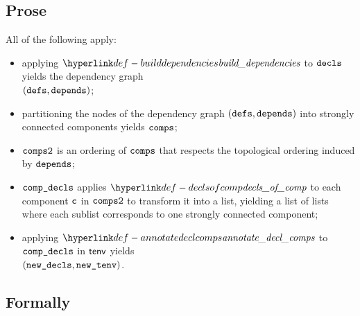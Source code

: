 \subsection{Prose}
All of the following apply:
\begin{itemize}
  \item applying $\builddependencies$ to $\decls$ yields the dependency graph \\ $(\defs, \dependencies)$;
  \item partitioning the nodes of the dependency graph $(\defs, \dependencies)$ into strongly connected components
        yields $\comps$;
  \item $\compstwo$ is an ordering of $\comps$ that respects the topological ordering induced by $\dependencies$;
  \item $\compdecls$ applies $\declsofcomp$ to each component $\vc$ in $\compstwo$ to transform it into a list,
        yielding a list of lists where each sublist corresponds to one strongly connected component;
  \item applying $\annotatedeclcomps$ to $\compdecls$ in $\tenv$ yields \\
        $(\newdecls, \newtenv)$\ProseOrTypeError.
\end{itemize}



\subsection{Formally}
\begin{mathpar}
\end{mathpar}

